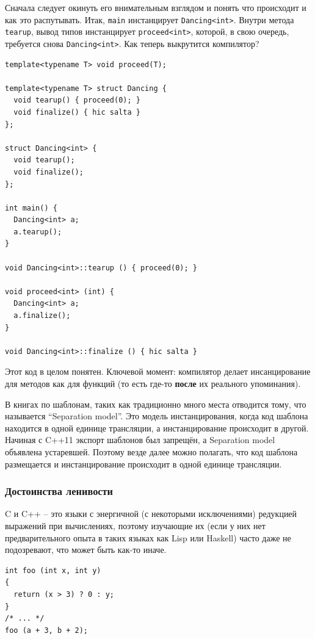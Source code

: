 \documentclass[a4paper,12pt,oneside]{article}
\begin{document}
Сначала следует окинуть его внимательным взглядом и понять что происходит и как это распутывать. Итак, \lstinline!main! инстанцирует \lstinline!Dancing<int>!. Внутри метода \lstinline!tearup!, вывод типов инстанцирует \lstinline!proceed<int>!, которой, в свою очередь, требуется снова \lstinline!Dancing<int>!. Как теперь выкрутится компилятор?

\begin{lstlisting}
template<typename T> void proceed(T);

template<typename T> struct Dancing {
  void tearup() { proceed(0); }
  void finalize() { hic salta }
};

struct Dancing<int> {
  void tearup();
  void finalize();
};

int main() {
  Dancing<int> a;
  a.tearup();
}

void Dancing<int>::tearup () { proceed(0); }

void proceed<int> (int) { 
  Dancing<int> a; 
  a.finalize(); 
}

void Dancing<int>::finalize () { hic salta }
\end{lstlisting}

Этот код в целом понятен. Ключевой момент: компилятор делает инсанцирование для методов как для функций (то есть где-то \textbf{после} их реального упоминания).

В книгах по шаблонам, таких как \cite{vandervoord} традиционно много места отводится тому, что называется ``Separation model''. Это модель инстанцирования, когда код шаблона находится в одной единице трансляции, а инстанцирование происходит в другой. Начиная с C++11 экспорт шаблонов был запрещён, а Separation model объявлена устаревшей. Поэтому везде далее можно полагать, что код шаблона размещается и инстанцирование происходит в одной единице трансляции.

\subsubsection{Достоинства ленивости}\label{Lazyness}

C и C++ -- это языки с энергичной (с некоторыми исключениями) редукцией выражений при вычислениях, поэтому изучающие их (если у них нет предварительного опыта в таких языках как Lisp или Haskell) часто даже не подозревают, что может быть как-то иначе.

\begin{lstlisting}
int foo (int x, int y)
{
  return (x > 3) ? 0 : y;
}
/* ... */
foo (a + 3, b + 2);
\end{lstlisting}
\end{document}
